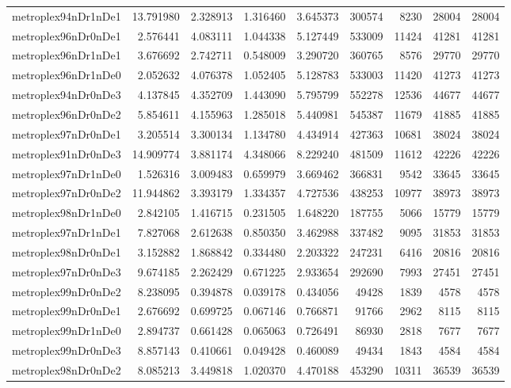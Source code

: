 \begin{longtable}{|l|r|r|r|r|r|r|r|r|}
metroplex94nDr1nDe1 & 13.791980 & 2.328913 & 1.316460 & 3.645373 & 300574 & 8230 & 28004 & 28004 \\
metroplex96nDr0nDe1 & 2.576441 & 4.083111 & 1.044338 & 5.127449 & 533009 & 11424 & 41281 & 41281 \\
metroplex96nDr1nDe1 & 3.676692 & 2.742711 & 0.548009 & 3.290720 & 360765 & 8576 & 29770 & 29770 \\
metroplex96nDr1nDe0 & 2.052632 & 4.076378 & 1.052405 & 5.128783 & 533003 & 11420 & 41273 & 41273 \\
metroplex94nDr0nDe3 & 4.137845 & 4.352709 & 1.443090 & 5.795799 & 552278 & 12536 & 44677 & 44677 \\
metroplex96nDr0nDe2 & 5.854611 & 4.155963 & 1.285018 & 5.440981 & 545387 & 11679 & 41885 & 41885 \\
metroplex97nDr0nDe1 & 3.205514 & 3.300134 & 1.134780 & 4.434914 & 427363 & 10681 & 38024 & 38024 \\
metroplex91nDr0nDe3 & 14.909774 & 3.881174 & 4.348066 & 8.229240 & 481509 & 11612 & 42226 & 42226 \\
metroplex97nDr1nDe0 & 1.526316 & 3.009483 & 0.659979 & 3.669462 & 366831 & 9542 & 33645 & 33645 \\
metroplex97nDr0nDe2 & 11.944862 & 3.393179 & 1.334357 & 4.727536 & 438253 & 10977 & 38973 & 38973 \\
metroplex98nDr1nDe0 & 2.842105 & 1.416715 & 0.231505 & 1.648220 & 187755 & 5066 & 15779 & 15779 \\
metroplex97nDr1nDe1 & 7.827068 & 2.612638 & 0.850350 & 3.462988 & 337482 & 9095 & 31853 & 31853 \\
metroplex98nDr0nDe1 & 3.152882 & 1.868842 & 0.334480 & 2.203322 & 247231 & 6416 & 20816 & 20816 \\
metroplex97nDr0nDe3 & 9.674185 & 2.262429 & 0.671225 & 2.933654 & 292690 & 7993 & 27451 & 27451 \\
metroplex99nDr0nDe2 & 8.238095 & 0.394878 & 0.039178 & 0.434056 & 49428 & 1839 & 4578 & 4578 \\
metroplex99nDr0nDe1 & 2.676692 & 0.699725 & 0.067146 & 0.766871 & 91766 & 2962 & 8115 & 8115 \\
metroplex99nDr1nDe0 & 2.894737 & 0.661428 & 0.065063 & 0.726491 & 86930 & 2818 & 7677 & 7677 \\
metroplex99nDr0nDe3 & 8.857143 & 0.410661 & 0.049428 & 0.460089 & 49434 & 1843 & 4584 & 4584 \\
metroplex98nDr0nDe2 & 8.085213 & 3.449818 & 1.020370 & 4.470188 & 453290 & 10311 & 36539 & 36539 \\

\end{longtable}
